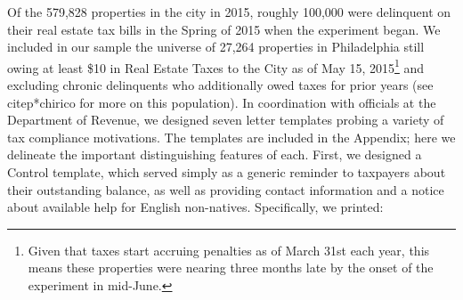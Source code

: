 \documentclass[12pt,titlepage]{article}
\begin{document}
%

Of the 579,828 properties in the city in 2015, roughly 100,000 were
delinquent on their real estate tax bills in the Spring of 2015 when
the experiment began. We included in our sample the universe of 27,264
properties in Philadelphia still owing at least \$10 in Real Estate
Taxes to the City as of May 15, 2015\footnote{
	Given that taxes start accruing penalties as of 
	March 31st each year, this means these properties were 
	nearing three months late by the onset of the 
	experiment in mid-June.}
and excluding chronic delinquents who additionally owed taxes for 
prior years (see citep*{chirico} for more on this population). 
In coordination with officials at the Department of Revenue, we designed 
seven letter templates probing a variety of tax compliance motivations. 
The templates are included in the Appendix; here we delineate the important 
distinguishing features of each. First, we designed a 
\hypertarget{control}{Control} template, which served simply as a generic 
reminder to taxpayers about their outstanding balance, as well as 
providing contact information and a notice about 
available help for English non-natives. Specifically, we printed:
\end{document}
